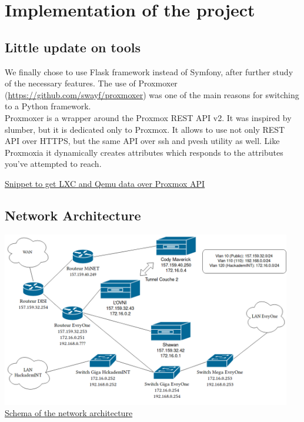 \pagebreak

\section{Implementation of the project}

\subsection{Little update on tools}

We finally chose to use Flask framework instead of Symfony, after further study of the necessary features.
The use of
Proxmoxer (\url{https://github.com/swayf/proxmoxer}) was one of the main reasons for switching to a Python framework. \\


Proxmoxer is a wrapper around the Proxmox REST API v2.
It was inspired by slumber, but it is dedicated only to Proxmox. It allows to use not only REST API over HTTPS, but the same API over ssh and pvesh utility as well.
Like Proxmoxia it dynamically creates attributes which responds to the attributes you've attempted to reach.
\\


\begin{center}

\underline{Snippet to get LXC and Qemu data over Proxmox API}

\end{center}

\subsection{Network Architecture}

\vspace{2cm}

\begin{center}
\includegraphics[width=0.95\textwidth]{images/reseau.png}
\\
\underline{Schema of the network architecture}
\end{center}

